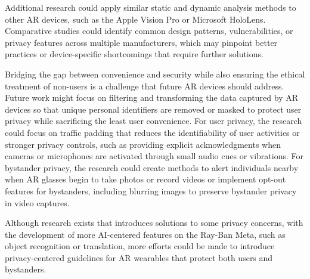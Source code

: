 Additional research could apply similar static and dynamic analysis methods to other AR devices, such as the Apple Vision Pro or Microsoft HoloLens. Comparative studies could identify common design patterns, vulnerabilities, or privacy features across multiple manufacturers, which may pinpoint better practices or device-specific shortcomings that require further solutions.

Bridging the gap between convenience and security while also ensuring the ethical treatment of non-users is a challenge that future AR devices should address. Future work might focus on filtering and transforming the data captured by AR devices so that unique personal identifiers are removed or masked to protect user privacy while sacrificing the least user convenience. For user privacy, the research could focus on traffic padding that reduces the identifiability of user activities or stronger privacy controls, such as providing explicit acknowledgments when cameras or microphones are activated through small audio cues or vibrations. For bystander privacy, the research could create methods to alert individuals nearby when AR glasses begin to take photos or record videos or implement opt-out features for bystanders, including blurring images to preserve bystander privacy in video captures. 

Although research exists that introduces solutions to some privacy concerns, with the development of more AI-centered features on the Ray-Ban Meta, such as object recognition or translation, more efforts could be made to introduce privacy-centered guidelines for AR wearables that protect both users and bystanders. 

